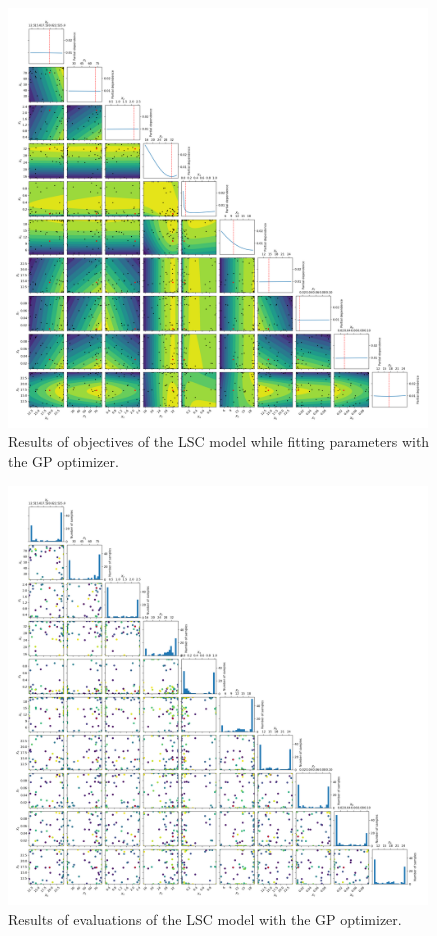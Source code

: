\documentclass[11pt, a4paper]{article}
\begin{document}
\begin{figure}[H]
    \centering
    \includegraphics[width=0.99\textwidth]{images/LSC_skopt_objective.png}
    \caption{Results of objectives of the LSC model while fitting parameters with the GP optimizer.}
    \label{fig:LSC_skopt_objective}
\end{figure}

\begin{figure}[H]
    \centering
    \includegraphics[width=0.99\textwidth]{images/LSC_skopt_evals.png}
    \caption{Results of evaluations of the LSC model with the GP optimizer.}
    \label{fig:LSC_skopt_evals}
\end{figure}
\end{document}
